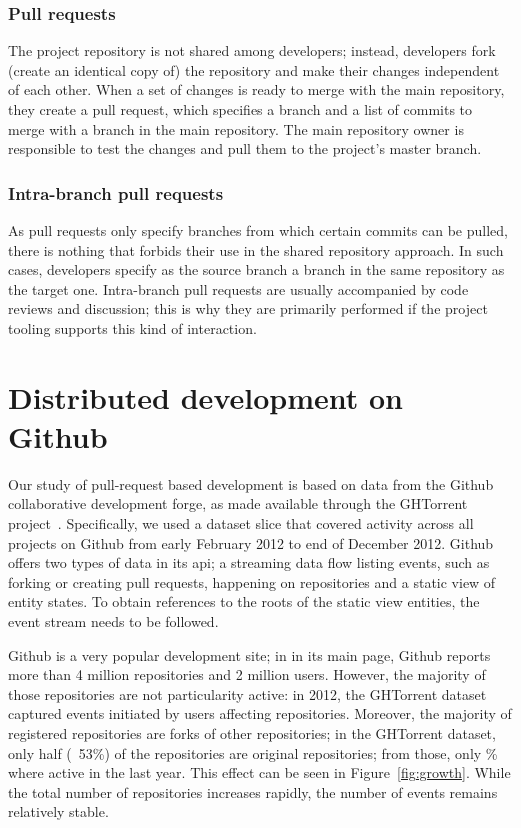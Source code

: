 \documentclass[conference]{IEEEtran}
\begin{document}
\subsubsection{Pull requests} The project repository is not shared among
developers; instead, developers fork (create an identical copy of) the
repository and make their changes independent of each other. When a set of
changes is ready to merge with the main repository, they create a pull request,
which specifies a branch and a list of commits to merge with a branch in the
main repository. The main repository owner is responsible to test the changes
and pull them to the project's master branch. 

\subsubsection{Intra-branch pull requests} As pull requests only specify branches
from which certain commits can be pulled, there is nothing that forbids their
use in the shared repository approach. In such cases, developers specify as the
source branch a branch in the same repository as the target one. Intra-branch
pull requests are usually accompanied by code reviews and discussion; this is
why they are primarily performed if the project tooling supports this kind of
interaction.

\section{Distributed development on Github}

Our study of pull-request based development is based on data from the Github
collaborative development forge, as made available through the GHTorrent
project~\cite{GS12}. Specifically, we used a dataset slice that covered activity
across all projects on Github from early February 2012 to end of December 2012.
Github offers two types of data in its {\sc api}; a streaming data flow listing
events, such as forking or creating pull requests, happening on repositories and
a static view of entity states. To obtain references to the roots of the static
view entities, the event stream needs to be followed.

Github is a very popular development site;
in in its main page, Github reports more than 4 million repositories and 2 
million users. However, the majority of those repositories are not particularity
active: in 2012, the GHTorrent dataset captured events initiated by  
users affecting 
repositories. 
Moreover, the majority of registered repositories are forks of other 
repositories; in the GHTorrent dataset, only half
(~53\%) of the repositories are original repositories;
from those, only \% where active in the last year.
This effect can be seen in Figure~\ref{fig:growth}. While the total number of
repositories increases rapidly, the number of events remains 
relatively stable.
\end{document}
